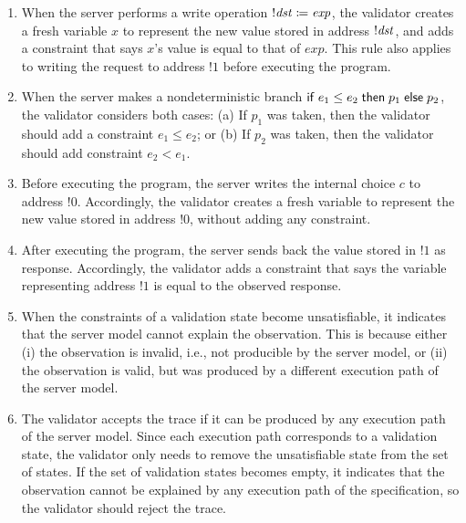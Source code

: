 \begin{enumerate}
\item \label{rule:write} When the server performs a write operation
  $!\mathit{dst}\coloneqq \mathit{exp}$, the validator creates a fresh variable $x$ to represent
  the new value stored in address $!\mathit{dst}$, and adds a constraint that says $x$'s
  value is equal to that of $\mathit{exp}$.  This rule also applies to writing the
  request to address $!1$ before executing the program.
\item \label{rule:branch} When the server makes a nondeterministic branch $\mathsf{if}\;
  e_1\le e_2\;\mathsf{then}\; p_1\;\mathsf{else}\; p_2$, the validator considers both cases: (a) If
  $p_1$ was taken, then the validator should add a constraint $e_1\le e_2$; or
  (b) If $p_2$ was taken, then the validator should add constraint $e_2<e_1$.
\item \label{rule:choice} Before executing the program, the server writes the internal
    choice $c$ to address $!0$.  Accordingly, the validator creates a fresh
    variable to represent the new value stored in address $!0$, without adding
    any constraint.
\item \label{rule:return} After executing the program, the server sends back the
  value stored in $!1$ as response.  Accordingly, the validator adds a
  constraint that says the variable representing address $!1$ is equal to the
  observed response.
\item \label{rule:unsat} When the constraints of a validation state become
  unsatisfiable, it indicates that the server model cannot explain the
  observation.  This is because either (i) the observation is invalid, i.e.,
  not producible by the server model, or (ii) the observation is valid, but was
  produced by a different execution path of the server model.
\item \label{rule:reject} The validator accepts the trace if it can be produced
  by any execution path of the server model.  Since each execution path
  corresponds to a validation state, the validator only needs to remove the
  unsatisfiable state from the set of states.  If the set of validation states
  becomes empty, it indicates that the observation cannot be explained by any
  execution path of the specification, so the validator should reject the trace.
\end{enumerate}

